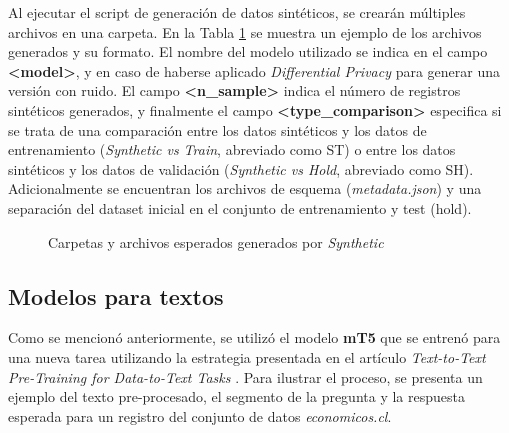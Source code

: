 Al ejecutar el script de generación de datos sintéticos, se crearán múltiples archivos en una carpeta. En la Tabla \ref{synth-folders} se muestra un ejemplo de los archivos generados y su formato. El nombre del modelo utilizado se indica en el campo \textbf{<model>}, y en caso de haberse aplicado \emph{Differential Privacy} para generar una versión con ruido. El campo \textbf{<n\_sample>} indica el número de registros sintéticos generados, y finalmente el campo \textbf{<type\_comparison>} especifica si se trata de una comparación entre los datos sintéticos y los datos de entrenamiento (\emph{Synthetic vs Train}, abreviado como ST) o entre los datos sintéticos y los datos de validación (\emph{Synthetic vs Hold}, abreviado como SH). Adicionalmente se encuentran los archivos de esquema (\emph{metadata.json}) y una separación del dataset inicial en el conjunto de entrenamiento y test (hold).
\begin{figure}[H]
	\centering
	
	\caption{Carpetas y archivos esperados generados por \emph{Synthetic}}
	\label{synth-folders}
\end{figure}


\newpage
\subsection{Modelos para textos}
Como se mencionó anteriormente, se utilizó el modelo \textbf{mT5} que se entrenó para una nueva tarea utilizando la estrategia presentada en el artículo \emph{Text-to-Text Pre-Training for Data-to-Text Tasks} \cite{kale_text--text_2020}. Para ilustrar el proceso, se presenta un ejemplo del texto pre-procesado, el segmento de la pregunta y la respuesta esperada para un registro del conjunto de datos \emph{economicos.cl}.


